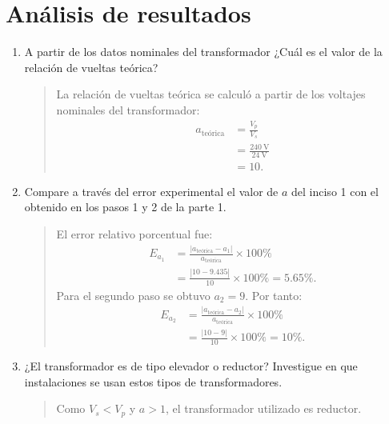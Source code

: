\documentclass[12pt,a4paper]{article}
\begin{document}
\section{Análisis de resultados}
\begin{enumerate}
    \item A partir de los datos nominales del transformador ¿Cuál es el valor de la relación de vueltas teórica?
    \begin{quote}
        La relación de vueltas teórica se calculó a partir de los voltajes nominales del transformador:
        \begin{align*}
            a_{\text{teórica}}&=\frac{V_p}{V_s}\\
            &=\frac{\SI{240}{\volt}}{\SI{24}{\volt}}\\
            &=10.
        \end{align*}
    \end{quote}
    \item Compare a través del error experimental el valor de $a$ del inciso 1 con el obtenido en los pasos 1 y 2 de la parte 1.
    \begin{quote}
        El error relativo porcentual fue:
            \begin{align*}
                E_{a_1}&=\frac{|a_{\text{teórica}}-a_1|}{a_{\text{teórica}}}\times100\%\\
                &=\frac{|10-9.435|}{10}\times100\%=5.65\%.
            \end{align*}
        Para el segundo paso se obtuvo $a_2=9$. Por tanto:
        \begin{align*}
            E_{a_2}&=\frac{|a_{\text{teórica}}-a_2|}{a_{\text{teórica}}}\times100\%\\
            &=\frac{|10-9|}{10}\times100\%=10\%.
        \end{align*}
    \end{quote}
    \item ¿El transformador es de tipo elevador o reductor? Investigue en que instalaciones se usan estos tipos de transformadores.
    \begin{quote}
        Como $V_s<V_p$ y $a>1$, el transformador utilizado es reductor. 
        

\end{quote}
\end{enumerate}
\end{document}
